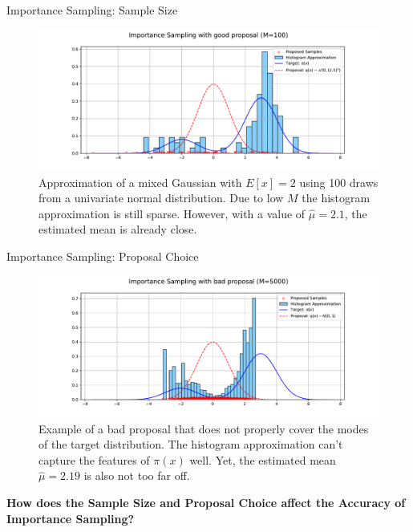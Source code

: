 \documentclass[10pt]{beamer}
\begin{document}
\begin{frame}{Importance Sampling: Sample Size}
			\begin{figure}
			    \centering
			    \includegraphics[scale=0.5]{pictures/IS_example3.pdf}
			    \caption{Approximation of a mixed Gaussian with $E[x] = 2$ using 100 draws from a univariate normal distribution. Due to low $M$ the histogram approximation is still sparse. However, with a value of $\hat{\mu} = 2.1$, the estimated mean is already close.}
			    \label{fig:IS_sim2}
			\end{figure}
			\vspace{0.5cm}
\end{frame}


\begin{frame}{Importance Sampling: Proposal Choice}
			\begin{figure}
			    \centering
			    \includegraphics[scale=0.5]{pictures/IS_example2.pdf}
			    \caption{Example of a bad proposal that does not properly cover the modes of the target distribution. The histogram approximation can't capture the features of $\pi(x)$ well. Yet, the estimated mean $\hat{\mu} = 2.19$ is also not too far off.}
			    \label{fig:IS_sim3}
			\end{figure}
   \vspace{-0.3cm}
\begin{center}
    \textbf{How does the Sample Size and Proposal Choice affect the Accuracy of Importance Sampling?}
\end{center}
\end{frame}
\end{document}
